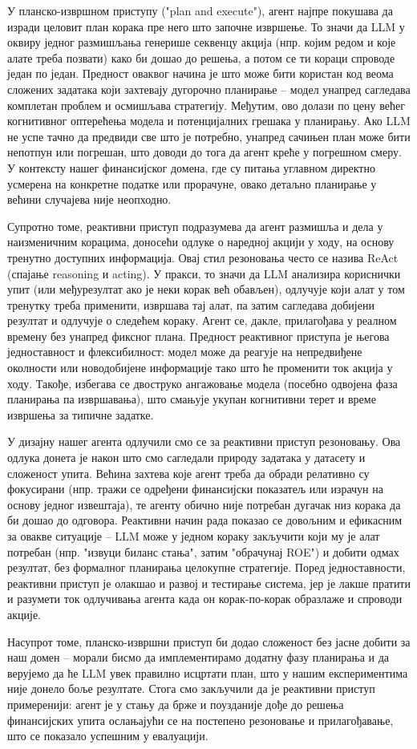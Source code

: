 У планско-извршном приступу ("plan and execute"), агент најпре покушава да изради целовит план корака пре него што започне извршење. То значи да LLM у оквиру једног размишљања генерише секвенцу акција (нпр. којим редом и које алате треба позвати) како би дошао до решења, а потом се ти кораци спроводе један по један. Предност оваквог начина је што може бити користан код веома сложених задатака који захтевају дугорочно планирање -- модел унапред сагледава комплетан проблем и осмишљава стратегију. Међутим, ово долази по цену већег когнитивног оптерећења модела и потенцијалних грешака у планирању. Ако LLM не успе тачно да предвиди све што је потребно, унапред сачињен план може бити непотпун или погрешан, што доводи до тога да агент креће у погрешном смеру. У контексту нашег финансијског домена, где су питања углавном директно усмерена на конкретне податке или прорачуне, овако детаљно планирање у већини случајева није неопходно.

Супротно томе, реактивни приступ подразумева да агент размишља и дела у наизменичним корацима, доносећи одлуке о наредној акцији у ходу, на основу тренутно доступних информација. Овај стил резоновања често се назива ReAct (спајање reasoning и acting). У пракси, то значи да LLM анализира кориснички упит (или међурезултат ако је неки корак већ обављен), одлучује који алат у том тренутку треба применити, извршава тај алат, па затим сагледава добијени резултат и одлучује о следећем кораку. Агент се, дакле, прилагођава у реалном времену без унапред фиксног плана. Предност реактивног приступа је његова једноставност и флексибилност: модел може да реагује на непредвиђене околности или новодобијене информације тако што ће променити ток акција у ходу. Такође, избегава се двоструко ангажовање модела (посебно одвојена фаза планирања па извршавања), што смањује укупан когнитивни терет и време извршења за типичне задатке.

У дизајну нашег агента одлучили смо се за реактивни приступ резоновању. Ова одлука донета је након што смо сагледали природу задатака у датасету и сложеност упита. Већина захтева које агент треба да обради релативно су фокусирани (нпр. тражи се одређени финансијски показатељ или израчун на основу једног извештаја), те агенту обично није потребан дугачак низ корака да би дошао до одговора. Реактивни начин рада показао се довољним и ефикасним за овакве ситуације -- LLM може у једном кораку закључити који му је алат потребан (нпр. "извуци биланс стања", затим "обрачунај ROE") и добити одмах резултат, без формалног планирања целокупне стратегије. Поред једноставности, реактивни приступ је олакшао и развој и тестирање система, јер је лакше пратити и разумети ток одлучивања агента када он корак-по-корак образлаже и спроводи акције.

Насупрот томе, планско-извршни приступ би додао сложеност без јасне добити за наш домен -- морали бисмо да имплементирамо додатну фазу планирања и да верујемо да ће LLM увек правилно исцртати план, што у нашим експериментима није донело боље резултате. Стога смо закључили да је реактивни приступ примеренији: агент је у стању да брже и поузданије дође до решења финансијских упита ослањајући се на постепено резоновање и прилагођавање, што се показало успешним у евалуацији.